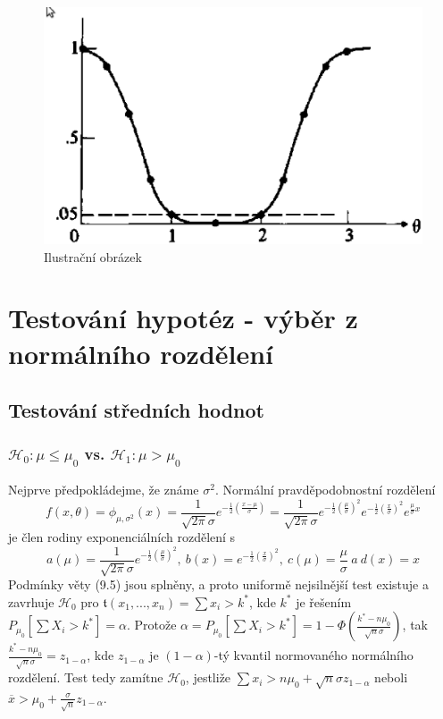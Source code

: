 \begin{figure}[htp]
\centering
\includegraphics[scale = 0.5]{pictures/example_9_18b.eps}
\caption{Ilustrační obrázek}
\label{example_9_18b}
\end{figure}

\section{Testování hypotéz - výběr z normálního rozdělení}

\subsection{Testování středních hodnot}

\subsubsection{$\mathscr{H}_0: \mu \le \mu_0$ vs. $\mathscr{H}_1: \mu > \mu_0$}

Nejprve předpokládejme, že známe $\sigma^2$. Normální pravděpodobnostní rozdělení
\begin{equation*}
f(x, \theta) = \phi_{\mu, \sigma^2}(x) = \frac{1}{\sqrt{2\pi} \sigma}e^{-\frac{1}{2}\left(\frac{x - \mu}{\sigma}\right)} = \frac{1}{\sqrt{2\pi}\sigma}e^{-\frac{1}{2}\left(\frac{\mu}{\sigma}\right)^2}e^{-\frac{1}{2}\left(\frac{x}{\sigma}\right)^2}e^{\frac{\mu}{\sigma}x}
\end{equation*}
je člen rodiny exponenciálních rozdělení s
\begin{equation*}
a(\mu) = \frac{1}{\sqrt{2 \pi}\sigma}e^{-\frac{1}{2}\left(\frac{\mu}{\sigma}\right)^2}, ~ b(x) = e^{-\frac{1}{2}\left(\frac{x}{\sigma}\right)^2}, ~ c(\mu) = \frac{\mu}{\sigma} ~ a ~ d(x) = x
\end{equation*}
Podmínky věty (9.5) jsou splněny, a proto uniformě nejsilnější test existuje a zavrhuje $\mathscr{H}_0$ pro $\mathfrak{t}(x_1, ..., x_n) = \sum x_i > k^*$, kde $k^*$ je řešením $P_{\mu_0}[\sum X_i > k^*] = \alpha$. Protože $\alpha = P_{\mu_0}[\sum X_i > k^*] = 1 - \Phi\left(\frac{k^* - n \mu_0}{\sqrt{n} \sigma}\right)$, tak $\frac{k^* - n \mu_0}{\sqrt{n} \sigma} = z_{1 - \alpha}$, kde $z_{1 - \alpha}$ je $(1 - \alpha)$-tý kvantil normovaného normálního rozdělení. Test tedy zamítne $\mathscr{H}_0$, jestliže $\sum x_i > n \mu_0 + \sqrt{n}\sigma z_{1 - \alpha}$ neboli $\overline{x} > \mu_0 + \frac{\sigma}{\sqrt{n}}z_{1 - \alpha}$.

